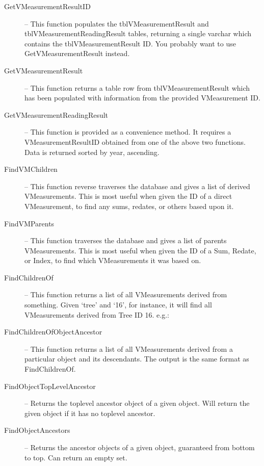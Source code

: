\begin{description}
 \item[GetVMeasurementResultID] -- This function populates the tblVMeasurementResult and tblVMeasurementReadingResult tables, returning a single varchar which contains the tblVMeasurementResult ID. You probably want to use GetVMeasurementResult instead.

 \item[GetVMeasurementResult] -- This function returns a table row from tblVMeasurementResult which has been populated with information from the provided VMeasurement ID. 

 \item[GetVMeasurementReadingResult] -- This function is provided as a convenience method. It requires a VMeasurementResultID obtained from one of the above two functions. Data is returned sorted by year, ascending. 

 \item[FindVMChildren] -- This function reverse traverses the database and gives a list of derived VMeasurements. This is most useful when given the ID of a direct VMeasurement, to find any sums, redates, or others based upon it. 

 \item[FindVMParents] -- This function traverses the database and gives a list of parents VMeasurements. This is most useful when given the ID of a Sum, Redate, or Index, to find which VMeasurements it was based on. 

 \item[FindChildrenOf] -- This function returns a list of all VMeasurements derived from something. Given `tree' and `16', for instance, it will find all VMeasurements derived from Tree ID 16. e.g.: 

 \item[FindChildrenOfObjectAncestor] -- This function returns a list of all VMeasurements derived from a particular object and its descendants. The output is the same format as FindChildrenOf. 

 \item[FindObjectTopLevelAncestor] -- Returns the toplevel ancestor object of a given object. Will return the given object if it has no toplevel ancestor. 

 \item[FindObjectAncestors] -- Returns the ancestor objects of a given object, guaranteed from bottom to top. Can return an empty set. 


\end{description}
